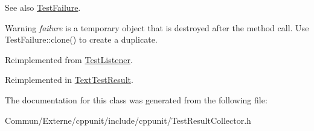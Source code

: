 \begin{DoxySeeAlso}{See also}
\hyperlink{class_test_failure}{Test\+Failure}. 
\end{DoxySeeAlso}
\begin{DoxyWarning}{Warning}
{\itshape failure} is a temporary object that is destroyed after the method call. Use Test\+Failure\+::clone() to create a duplicate. 
\end{DoxyWarning}


Reimplemented from \hyperlink{class_test_listener_a103216a5814c907f7b752b969477e765}{Test\+Listener}.



Reimplemented in \hyperlink{class_text_test_result_a05d3b0e8e51b3430092166bbc3d17708}{Text\+Test\+Result}.



The documentation for this class was generated from the following file\+:\begin{DoxyCompactItemize}
\item 
Commun/\+Externe/cppunit/include/cppunit/Test\+Result\+Collector.\+h\end{DoxyCompactItemize}
